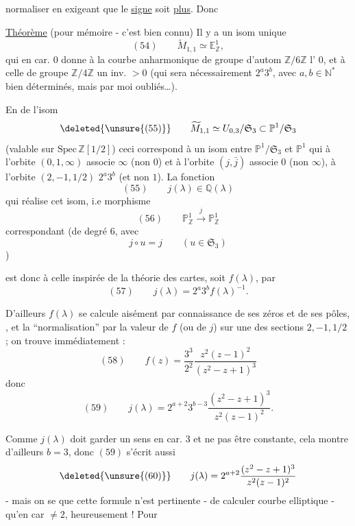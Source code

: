 normaliser en exigeant que le \uline{signe} soit \uline{plus}. Donc

\uline{Théorème} (pour mémoire - c'est bien connu) Il y a un isom unique
\[
(54)\qquad
\widetilde M_{1,1}\simeq\mathbb E^1_{\mathbb Z},
\]
qui  en car. $0$ donne à la courbe anharmonique de groupe
d'autom $\mathbb Z/6\mathbb Z$
l' $0$, et à celle de
groupe $\mathbb Z/4\mathbb Z$ un inv.  $>0$
(qui sera nécessairement $2^a3^b$, avec $a,b\in\mathbb N^*$ bien
déterminés, mais par moi oubliés\ldots).

En  de l'isom
\[
\deleted{\unsure{(55)}}\qquad
\widetilde M_{1,1}\simeq U_{0,3}/\mathfrak S_3
\subset \mathbb P^1/\mathfrak S_3
\]
(valable sur $\mathrm{Spec}\,\mathbb Z[1/2]$)
ceci correspond à  un isom entre
$\mathbb P^1/\mathfrak S_3$ et $\mathbb P^1$ qui à l'orbite
$(0,1,\infty)$ associe $\infty$ (non $0$) et à l'orbite $(j,\bar j)$
associe $0$ (non $\infty$), à l'orbite $(2,-1,1/2)$
 $2^a3^b$ (et non $1$). La fonction
\[
(55)\qquad j(\lambda)\in\mathbb Q(\lambda)
\]
qui réalise cet isom, i.e   morphisme
\[
(56)\qquad
\mathbb P^1_{\mathbb Z}\xrightarrow{j}\mathbb P^1_{\mathbb Z}
\]
correspondant (de degré $6$, avec
\[
j\circ u=j
\qquad(u\in\mathfrak S_3)
\]
)

est donc  à celle inspirée de la théorie des cartes,
soit $f(\lambda)$, par
\[
(57)\qquad
j(\lambda)=2^a3^b f(\lambda)^{-1}.
\]

D'ailleurs $f(\lambda)$  se calcule aisément
par connaissance de ses zéros et de ses pôles,
,
 et la ``normalisation'' par la valeur de $f$
(ou de $j$) sur une des sections $2,-1,1/2$ ; on trouve immédiatement :
\[
(58)\qquad
f(z)=\frac{3^3}{2^2}\frac{z^2(z-1)^2}{(z^2-z+1)^3}
\]
donc
\[
(59)\qquad
j(\lambda)=2^{a+2}3^{b-3}\frac{(z^2-z+1)^3}{z^2(z-1)^2}.
\]

Comme $j(\lambda)$ doit garder un sens en car. $3$ et ne pas être
constante, cela montre d'ailleurs \uline{$b=3$}, donc $(59)$ s'écrit aussi
\[
\deleted{\unsure{(60)}}\qquad
j(\lambda)=2^{a+2}\frac{(z^2-z+1)^3}{z^2(z-1)^2}
\]
- mais on se  que cette formule n'est pertinente -
 de calculer
courbe elliptique - qu'en car $\ne 2$, heureusement !
Pour 

